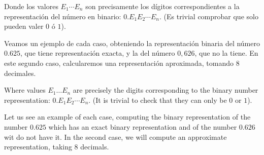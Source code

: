 \begin{paracol}{2}
Donde los valores $E_1\cdots E_n$ son precisamente los dígitos correspondientes a la representación del número en binario: $0.E_1E_2\cdots E_n$. (Es trivial comprobar que solo pueden valer $0$ ó $1$).


Veamos un ejemplo de cada caso, obteniendo la representación binaria del número $0.625$, que tiene representación exacta, y la del número $0,626$, que no la tiene. En este segundo caso, calcularemos una representación aproximada, tomando 8 decimales.

\switchcolumn
Where values $E_1 \dots E_n$ are precisely the digits corresponding to the binary number representation: $0.E_1E_2\cdots E_n$.  (It is trivial to check that they can only be $0$ or $1$). 

Let us see an example of each case, computing the binary representation of the number $0.625$ which has an exact binary representation and of the number $0.626$ wit do not have it. In the second case, we will compute an approximate representation, taking 8 decimals.

\end{paracol}

